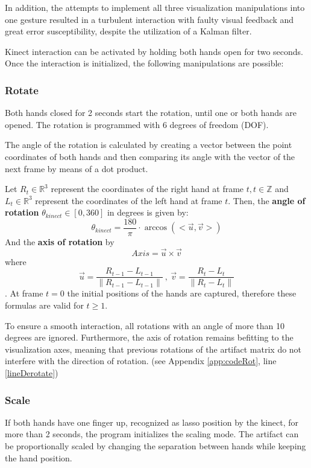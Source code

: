 \documentclass[12pt]{extarticle}
\newcommand{\R}{\mathbb{R}}
\newcommand{\Z}{\mathbb{Z}}
\begin{document}
In addition, the attempts to implement all three visualization manipulations into one gesture resulted in a turbulent interaction with faulty visual feedback and great error susceptibility, despite the utilization of a Kalman filter.

Kinect interaction can be activated by holding both hands open for two seconds. Once the interaction is initialized, the following manipulations are possible:

\subsubsection {Rotate}\label{subsubsec Rot}
Both hands closed for 2 seconds start the rotation, until one or both hands are opened. The rotation is programmed with 6 degrees of freedom (DOF).

The angle of the rotation is calculated by creating a vector between the point coordinates of both hands and then comparing its angle with the vector of the next frame by means of a dot product.

Let $R_t\in \R^3$ represent the coordinates of the right hand at frame $t, t\in \Z$ and $L_t\in\R^3$ represent the coordinates of the left hand at frame $t$. Then, the \textbf{angle of rotation }$\theta_{kinect}\in [0, 360]$ in degrees is given by:
\[\theta_{kinect}=\frac{180}{\pi}\cdot \arccos(<\overrightarrow{u}, \overrightarrow{v}>)\]
And the \textbf{axis of rotation} by
\[Axis=\overrightarrow{u}\times \overrightarrow{v}\]
where $$\overrightarrow{u}=\frac{R_{t-1}-L_{t-1}}{\|R_{t-1}-L_{t-1}\|}\ , \ \overrightarrow{v}=\frac{R_t-L_t}{\|R_t-L_t\|}$$.
At frame $t=0$ the initial positions of the hands are captured, therefore these formulas are valid for $t\geq 1$.

To ensure a smooth interaction, all rotations with an angle of more than 10 degrees are ignored. Furthermore, the axis of rotation remains befitting to the visualization axes, meaning that previous rotations of the artifact matrix do not interfere with the direction of rotation. (see Appendix \ref{app:codeRot}, line \ref{lineDerotate})

\subsubsection {Scale}\label{subsubsec Scale} If both hands have one finger up, recognized as lasso position by the kinect, for more than 2 seconds, the program initializes the scaling mode. The artifact can be proportionally scaled by changing the separation between hands while keeping the hand position.
\end{document}
